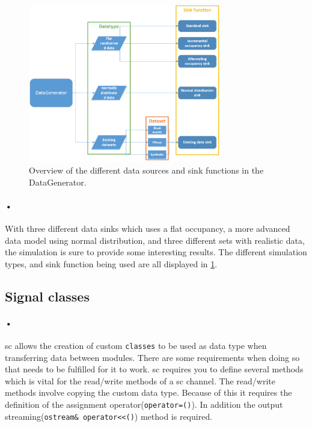 \documentclass[a4paper, 12pt]{report}
\newcommand{\codeword}[1]{\texttt{#1}}
\begin{document}
\begin{figure}[h!]
	\centering
		\includegraphics[width=0.75\textwidth]{images/dg-overview.png}
		\caption{Overview of the different data sources and sink functions in the DataGenerator.}
		\label{fig:dg-overview}
\end{figure}

\paragraph{•}
With three different data sinks which uses a flat occupancy, a more advanced data model using normal distribution, and three different sets with realistic data, the simulation is sure to provide some interesting results.
The different simulation types, and sink function being used are all displayed in \ref{fig:dg-overview}.

\subsection{Signal classes}
\label{subsec:signal-classes}
\paragraph{•}
\gls{sc} allows the creation of custom \codeword{classes} to be used as data type when transferring data between modules.
There are some requirements when doing so that needs to be fulfilled for it to work.
\gls{sc} requires you to define several methods which is vital for the read/write methods of a \gls{sc} channel.
The read/write methods involve copying the custom data type.
Because of this it requires the definition of the assignment operator(\codeword{operator=()}).
In addition the output streaming(\codeword{ostream\& operator<<()}) method is required. 
\end{document}

